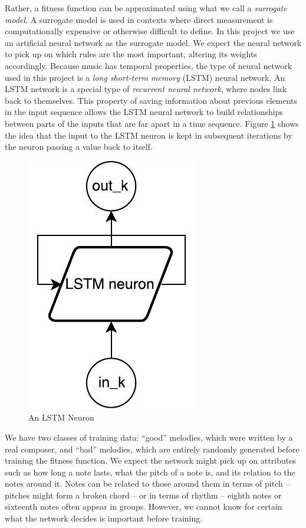 Rather, a fitness function can be approximated using what we call a \textit{surrogate model}.
A surrogate model is used in contexts where direct measurement is computationally expensive or otherwise difficult to define.
In this project we use an artificial neural network as the surrogate model.
We expect the neural network to pick up on which rules are the most important, altering its weights accordingly.
Because music has temporal properties, the type of neural network used in this project is a \textit{long short-term memory} (LSTM) neural network.
An LSTM network is a special type of \textit{recurrent neural network}, where nodes link back to themselves.
This property of saving information about previous elements in the input sequence allows the LSTM neural network to build relationships between parts of the inputs that are far apart in a time sequence.
Figure \ref{fig:lstm_cell} shows the idea that the input to the LSTM neuron is kept in subsequent iterations by the neuron passing a value back to itself.

\begin{figure}[h]
	\centering
	\includegraphics{figures/lstm_cell.pdf}
	\caption{An LSTM Neuron}
	\label{fig:lstm_cell}
\end{figure}

We have two classes of training data: ``good'' melodies, which were written by a real composer, and ``bad'' melodies, which are entirely randomly generated before training the fitness function.
We expect the network might pick up on attributes such as how long a note lasts, what the pitch of a note is, and its relation to the notes around it.
Notes can be related to those around them in terms of pitch -- pitches might form a broken chord -- or in terms of rhythm -- eighth notes or sixteenth notes often appear in groups.
However, we cannot know for certain what the network decides is important before training.

